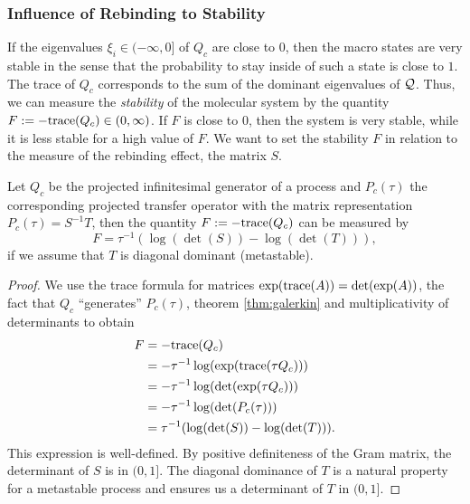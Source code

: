 \subsubsection*{Influence of Rebinding to Stability}

If the eigenvalues $\xi_i \in \mathopen(-\infty,0 \mathclose]$ of $Q_c$ are close to $0$, then the macro states are very stable in the sense that the probability to stay inside of such a state is close to $1$.
The trace of $Q_c$ corresponds to the sum of the dominant eigenvalues of $\mathcal{Q}$.
Thus, we can measure the \textit{stability} of the molecular system by the quantity $F := - \mathrm{trace}(Q_c) \in \mathopen(0, \infty \mathclose)$.
If $F$ is close to $0$, then the system is very stable, while it is less stable for a high value of $F$.
We want to set the stability $F$ in relation to the measure of the rebinding effect, the matrix $S$.
\begin{lem}%
\label{lem:stability}
Let $Q_c$ be the projected infinitesimal generator of a process and $P_c(\tau)$ the corresponding projected transfer operator with the matrix representation $P_c(\tau) = S^{-1}T$,
then the quantity $F := - \mathrm{trace}(Q_c)$ can be measured by
\begin{equation}
\label{eq:stability}
F = \tau^{-1}(\log(\det(S)) - \log(\det(T))),
\end{equation}
if we assume that $T$ is diagonal dominant (metastable).
\end{lem}
\begin{proof}
We use the trace formula\cite[p. 208]{arfken1995mathematical} for matrices $\exp(\mathrm{trace}(A)) = \det(\exp(A))$, the fact that $Q_c$ ``generates'' $P_c(\tau)$, theorem \ref{thm:galerkin} and multiplicativity of determinants to obtain
\begin{align*}
F & = - \mathrm{trace}(Q_c) \\
  & = -  \tau^{-1}\log(\exp(\mathrm{trace}(\tau Q_c))) \\
  & = -  \tau^{-1}\log(\det(\exp(\tau Q_c)))  \\
  & = -  \tau^{-1} \log(\det(P_c(\tau))) \\
  & = \tau^{-1}(\log(\det(S)) - \log(\det(T))).
\end{align*}
This expression is well-defined.
By positive definiteness of the Gram matrix, the determinant of $S$ is in $\mathopen(0,1\mathclose]$.
The diagonal dominance of $T$ is a natural property for a metastable process and ensures us a determinant of $T$ in $\mathopen(0,1\mathclose]$.
\end{proof}

